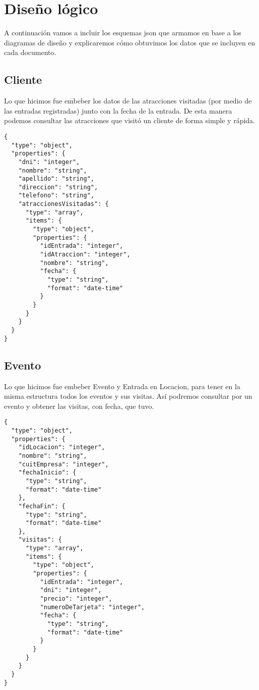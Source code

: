 \section{Diseño lógico}

\par A continuación vamos a incluir los esquemas json que armamos en base a los diagramas de diseño y explicaremos cómo obtuvimos los datos que se incluyen en cada documento.

\subsection{Cliente}
\par Lo que hicimos fue embeber los datos de las atracciones visitadas (por medio de las entradas registradas) junto con la fecha de la entrada.
De esta manera podemos consultar las atracciones que visitó un cliente de forma simple y rápida.
\begin{verbatim}
{
  "type": "object",
  "properties": {
    "dni": "integer",
    "nombre": "string",
    "apellido": "string",
    "direccion": "string",
    "telefono": "string",
    "atraccionesVisitadas": {
      "type": "array",
      "items": {
        "type": "object",
        "properties": {
          "idEntrada": "integer",
          "idAtraccion": "integer",
          "nombre": "string",
          "fecha": {
            "type": "string",
            "format": "date-time"
          }
        }
      }
    }
  }
}
\end{verbatim}

\subsection{Evento}
\par Lo que hicimos fue embeber Evento y Entrada en Locacion, para tener en la misma estructura todos los eventos y sus visitas.
Así podremos consultar por un evento y obtener las visitas, con fecha, que tuvo.
\begin{verbatim}
{
  "type": "object",
  "properties": {
    "idLocacion": "integer",
    "nombre": "string",
    "cuitEmpresa": "integer",
    "fechaInicio": {
      "type": "string",
      "format": "date-time"
    },
    "fechaFin": {
      "type": "string",
      "format": "date-time"
    },
    "visitas": {
      "type": "array",
      "items": {
        "type": "object",
        "properties": {
          "idEntrada": "integer",
          "dni": "integer",
          "precio": "integer",
          "numeroDeTarjeta": "integer",
          "fecha": {
            "type": "string",
            "format": "date-time"
          }
        }
      }
    }
  }
}
\end{verbatim}

